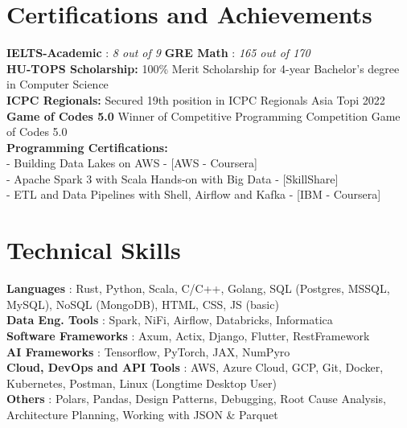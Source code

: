 \documentclass[letterpaper,10pt]{article}
\newcommand{\sectionspace}{
\vspace{-15pt}
}
\newcommand{\subheadingtitlevspace}{
\vspace{-3pt}
}
\newcommand{\titleItem}[1]{
  \textbf{#1}
}
\begin{document}
\section{Certifications and Achievements}
\subheadingtitlevspace
\begin{itemize}[leftmargin=0.15in, label={}]
	{\item{
          \titleItem{IELTS-Academic}{: \textit{8 out of 9}} \hspace{4.25cm} \titleItem{GRE Math}{: \textit{165 out of 170}} \\
          \titleItem{HU-TOPS Scholarship:}{100\% Merit Scholarship for 4-year Bachelor's degree in Computer Science} \\
          \titleItem{ICPC Regionals:}{Secured 19th position in ICPC Regionals Asia Topi 2022} \\
          \titleItem{Game of Codes 5.0}{Winner of Competitive Programming Competition Game of Codes 5.0 } \\
            \textbf{Programming Certifications:}\\
            - Building Data Lakes on AWS - [AWS - Coursera]\\
            - Apache Spark 3 with Scala Hands-on with Big Data - [SkillShare]\\
            - ETL and Data Pipelines with Shell, Airflow and Kafka - [IBM - Coursera]\\
	}}
\end{itemize}


\sectionspace

\section{Technical Skills}
\subheadingtitlevspace
\begin{itemize}[leftmargin=0.15in, label={}]
	{\item{
          \titleItem{Languages}{: Rust, Python, Scala, C/C++, Golang, SQL (Postgres, MSSQL,
          MySQL), NoSQL (MongoDB), HTML, CSS, JS (basic)} \\
          \titleItem{Data Eng. Tools}{: Spark, NiFi, Airflow, Databricks, Informatica}\\
          \titleItem{Software Frameworks}{: Axum, Actix, Django, Flutter, RestFramework}\\
          \titleItem{AI Frameworks}{: Tensorflow, PyTorch, JAX, NumPyro}\\
          \titleItem{Cloud, DevOps and API Tools}{: AWS, Azure Cloud, GCP, Git,
          Docker, Kubernetes, Postman, Linux (Longtime Desktop User)} \\
          \titleItem{Others}{: Polars, Pandas, Design Patterns, Debugging, Root
          Cause Analysis, Architecture Planning, Working with JSON \& Parquet}
	}}
\end{itemize}
\sectionspace

\end{document}
